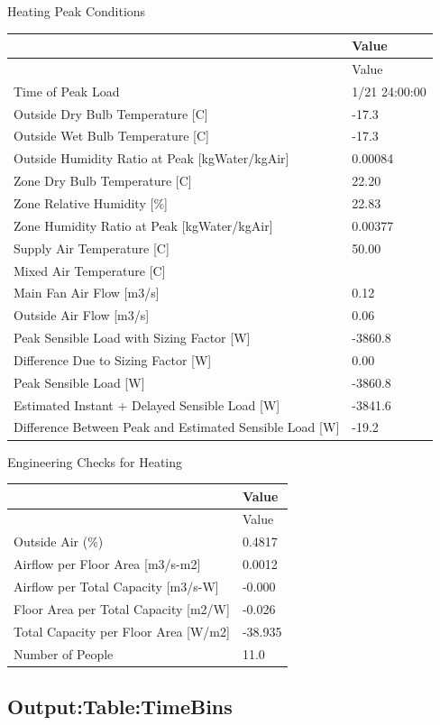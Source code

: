 Heating Peak Conditions

{\scriptsize
\begin{longtable}[c]{@{}ll@{}}
\toprule
 & Value \tabularnewline
\midrule
\endfirsthead

\toprule
 & Value \tabularnewline
\midrule
\endhead

Time of Peak Load & 1/21 24:00:00 \tabularnewline
Outside Dry Bulb Temperature {[}C{]} & -17.3 \tabularnewline
Outside Wet Bulb Temperature {[}C{]} & -17.3 \tabularnewline
Outside Humidity Ratio at Peak {[}kgWater/kgAir{]} & 0.00084 \tabularnewline
Zone Dry Bulb Temperature {[}C{]} & 22.20 \tabularnewline
Zone Relative Humidity {[}\%{]} & 22.83 \tabularnewline
Zone Humidity Ratio at Peak {[}kgWater/kgAir{]} & 0.00377 \tabularnewline
Supply Air Temperature {[}C{]} & 50.00 \tabularnewline
Mixed Air Temperature {[}C{]} &  \tabularnewline
Main Fan Air Flow {[}m3/s{]} & 0.12 \tabularnewline
Outside Air Flow {[}m3/s{]} & 0.06 \tabularnewline
Peak Sensible Load with Sizing Factor {[}W{]} & -3860.8 \tabularnewline
Difference Due to Sizing Factor {[}W{]} & 0.00 \tabularnewline
Peak Sensible Load {[}W{]} & -3860.8 \tabularnewline
Estimated Instant + Delayed Sensible Load {[}W{]} & -3841.6 \tabularnewline
Difference Between Peak and Estimated Sensible Load {[}W{]} & -19.2 \tabularnewline

\bottomrule
\end{longtable}}

Engineering Checks for Heating

{\scriptsize
\begin{longtable}[c]{@{}ll@{}}
\toprule
 & Value \tabularnewline
\midrule
\endfirsthead

\toprule
 & Value \tabularnewline
\midrule
\endhead

Outside Air (\%) & 0.4817 \tabularnewline
Airflow per Floor Area {[}m3/s-m2{]} & 0.0012 \tabularnewline
Airflow per Total Capacity {[}m3/s-W{]} & -0.000 \tabularnewline
Floor Area per Total Capacity {[}m2/W{]} & -0.026 \tabularnewline
Total Capacity per Floor Area {[}W/m2{]} & -38.935 \tabularnewline
Number of People & 11.0 \tabularnewline

\bottomrule
\end{longtable}}


\subsection{Output:Table:TimeBins}\label{outputtabletimebins}

